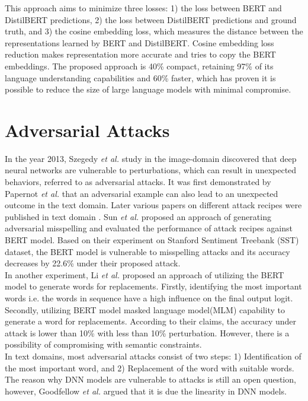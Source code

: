 \documentclass[%
	BCOR=8mm, %
	DIV=12,
	toc=bibliography, %
	toc=listof, %
	oneside, %
	egregdoesnotlikesansseriftitles, %
	]{scrbook}
\begin{document}
This approach aims to minimize three losses: 1) the loss between BERT and DistilBERT predictions, 2) the loss between DistilBERT predictions and ground truth, and 3) the cosine embedding loss, which measures the distance between the representations learned by BERT and DistilBERT. Cosine embedding loss reduction makes representation more accurate and tries to copy the BERT embeddings. The proposed approach is 40\% compact, retaining 97\% of its language understanding capabilities and 60\% faster\cite{sanh_distilbert_2020}, which has proven it is possible to reduce the size of large language models with minimal compromise.

\section{Adversarial Attacks}
\label{section:advattacks}
In the year 2013, Szegedy \textit{et al.} \cite{szegedy_intriguing_2014} study in the image-domain discovered that deep neural networks are vulnerable to perturbations, which can result in unexpected behaviors, referred to as adversarial attacks. It was first demonstrated by Papernot \textit{et al.}  \cite{papernot_crafting_2016} that an adversarial example can also lead to an unexpected outcome in the text domain. Later various papers on different attack recipes were published in text domain \cite{alzantot_generating_2018,li_bert-attack_2020,gao_black-box_2018,li_bert-attack_2020,ren_generating_2019,garg_bae_2020,chen_robustness_2019}.  Sun \textit{et al.}  \cite{sun_adv-bert_2020} proposed an approach of  generating adversarial misspelling and evaluated the performance of  attack recipes  against BERT model. Based on their experiment on Stanford Sentiment Treebank (SST) dataset, the BERT model is vulnerable to misspelling attacks and its accuracy decreases by 22.6\% under their proposed attack.\\
In another experiment, Li \textit{et al.} \cite{li_bert-attack_2020} proposed an approach of utilizing the BERT model to generate words for replacements. Firstly, identifying the most important words i.e. the words in sequence have a high influence on the final output logit. Secondly, utilizing BERT model masked language model(MLM) capability to generate a word for replacements. According to their claims, the accuracy under attack is lower than 10\% with less than 10\% perturbation. However, there is a possibility of compromising with semantic constraints.\\
In text domains, most adversarial attacks consist of two steps: 1) Identification of the most important word, and 2) Replacement of the word with suitable words. The reason why DNN models are vulnerable to attacks is still an open question, however, Goodfellow \textit{et al.} \cite{goodfellow_explaining_2015} argued that it is due the linearity in DNN models.
\end{document}
